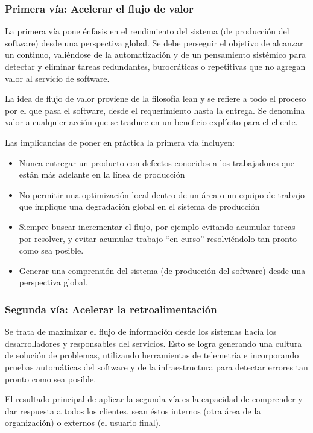 \subsubsection{Primera vía: Acelerar el flujo de valor }

La primera vía pone énfasis en el rendimiento del sistema (de
producción del software) desde una perspectiva global. Se debe
perseguir el objetivo de alcanzar un  continuo,
valiéndose de la automatización y de un pensamiento sistémico para
detectar y eliminar tareas redundantes, burocráticas o repetitivas que
no agregan valor al servicio de software.

La idea de flujo de valor proviene de la filosofía lean y se refiere a
todo el proceso por el que pasa el software, desde el requerimiento
hasta la entrega. Se denomina valor a cualquier acción que se traduce
en un beneficio explícito para el cliente.

Las implicancias de poner en práctica la primera vía incluyen:

\begin{itemize}
\item Nunca entregar un producto con defectos conocidos a los
  trabajadores que están más adelante en la línea de producción
\item No permitir una optimización local dentro de un área o un equipo
  de trabajo que implique una degradación global en el sistema de
  producción
\item Siempre buscar incrementar el flujo, por ejemplo evitando
  acumular tareas por resolver, y evitar acumular trabajo ``en curso''
  resolviéndolo tan pronto como sea posible.
\item Generar una comprensión del sistema (de producción del software)
  desde una perspectiva global.
\end{itemize}
\subsubsection{Segunda vía: Acelerar la retroalimentación}

Se trata de maximizar el flujo de información desde los sistemas hacia
los desarrolladores y responsables del servicios. Esto se logra
generando una cultura de solución de problemas, utilizando
herramientas de telemetría e incorporando pruebas automáticas del
software y de la infraestructura para detectar errores tan pronto como
sea posible.

El resultado principal de aplicar la segunda vía es la capacidad de
comprender y dar respuesta a todos los clientes, sean éstos internos
(otra área de la organización) o externos (el usuario final).

